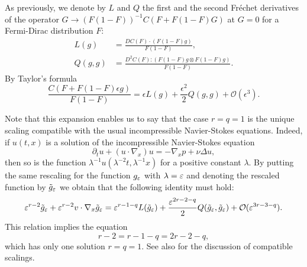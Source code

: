 



As previously, we denote by $L$ and $Q$ the first and the second Fréchet derivatives of the operator 
$G\to (F(1-F))^{-1}C(F+F(1-F)G)$ at $G=0$ for a Fermi-Dirac distribution $F$:
\begin{equation*}\label{eq:fre}\begin{aligned}
L(g)&=\frac{DC(F)\cdot (F(1-F)g)}{F(1-F)},\\Q(g,g)&=\frac{D^2C(F): 
(F(1-F)g\otimes F(1-F)g)}{F(1-F)}.\end{aligned}
\end{equation*}
By Taylor's formula%
\begin{equation*}\label{eq:expansion-d}
\frac{C(F+F(1-F)\epsilon g)}{F(1-F)}= \epsilon L(g) +\frac{\epsilon^2}{2} Q(g,g)+\mathcal O(\epsilon^3).
\end{equation*}



 Note that this expansion enables us to say that the case $r=q=1$ is the unique scaling compatible with the usual incompressible Navier-Stokes equations.  
  Indeed, if $u(t,x)$ is a solution of the incompressible Navier-Stokes equation \[ \partial_t u+(u\cdot\nabla_x)u=-\nabla_xp+\nu \Delta u,\] then so is the function $ \lambda^{-1} u(\lambda^{-2}t,\lambda^{-1}x)$ for a positive constant $\lambda$.
By putting the same rescaling for the function  $g_{\varepsilon} $ with $\lambda={\varepsilon}$ and denoting the rescaled function by $\tilde g_{\varepsilon}$ we obtain that the following identity must hold:
\[{\varepsilon}^{r-2}\tilde g_{\varepsilon} +{\varepsilon}^{r-2} v\cdot\nabla_x \tilde g_{\varepsilon} = {\varepsilon}^{r-1-q}L(\tilde g_{\varepsilon})+\frac {{\varepsilon}^{2r-2-q}}{2}Q(\tilde g_{\varepsilon},\tilde g_{\varepsilon}) +\mathcal O({\varepsilon} ^{3r-3-q}). \]
This relation implies the equation \[r-2=r-1-q=2r-2-q,\]which has only one solution $r=q=1$. See also \cite{bouchut2000kinetic,de1989incompressible} for the discussion of compatible scalings.

